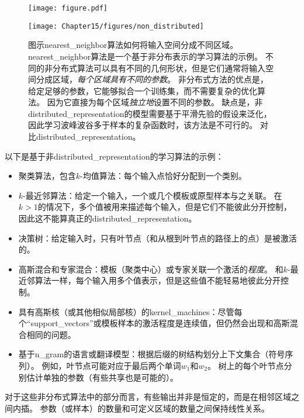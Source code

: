\begin{figure}[!htb]
\ifOpenSource
\centerline{\texttt{[image: figure.pdf]}}
\else
\centerline{\texttt{[image: Chapter15/figures/non\_distributed]}}
\fi
\caption{图示\gls{nearest_neighbor}算法如何将输入空间分成不同区域。
\gls{nearest_neighbor}算法是一个基于非分布表示的学习算法的示例。
不同的非分布式算法可以具有不同的几何形状，但是它们通常将输入空间分成区域，\emph{每个区域具有不同的参数}。
非分布式方法的优点是，给定足够的参数，它能够拟合一个训练集，而不需要复杂的优化算法。
因为它直接为每个区域\emph{独立地}设置不同的参数。
缺点是，非\gls{distributed_representation}的模型需要基于平滑先验的假设来泛化，因此学习波峰波谷多于样本的复杂函数时，该方法是不可行的。
对比\gls{distributed_representation}。
}
\label{fig:chap15_nondistributed}
\end{figure}

以下是基于非\gls{distributed_representation}的学习算法的示例：
\begin{itemize}
	\item 聚类算法，包含$k$-均值算法：每个输入点恰好分配到一个类别。

	\item $k$-最近邻算法：给定一个输入，一个或几个模板或原型样本与之关联。
	在$k > 1$的情况下，多个值被用来描述每个输入，但是它们不能彼此分开控制，因此这不能算真正的\gls{distributed_representation}。

	\item 决策树：给定输入时，只有叶节点（和从根到叶节点的路径上的点）是被激活的。

	\item 高斯混合和专家混合：模板（聚类中心）或专家关联一个激活的\emph{程度}。
	和$k$-最近邻算法一样，每个输入用多个值表示，但是这些值不能轻易地彼此分开控制。

	\item 具有高斯核（或其他相似局部核）的\gls{kernel_machines}：尽管每个``\gls{support_vectors}''或模板样本的激活程度是连续值，但仍然会出现和高斯混合相同的问题。

	\item 基于\gls{n_gram}的语言或翻译模型：根据后缀的树结构划分上下文集合（符号序列）。
	例如，叶节点可能对应于最后两个单词$w_1$和$w_2$。
	树上的每个叶节点分别估计单独的参数（有些共享也是可能的）。
\end{itemize}


对于这些非分布式算法中的部分而言，有些输出并非是恒定的，而是在相邻区域之间内插。
参数（或样本）的数量和可定义区域的数量之间保持线性关系。


